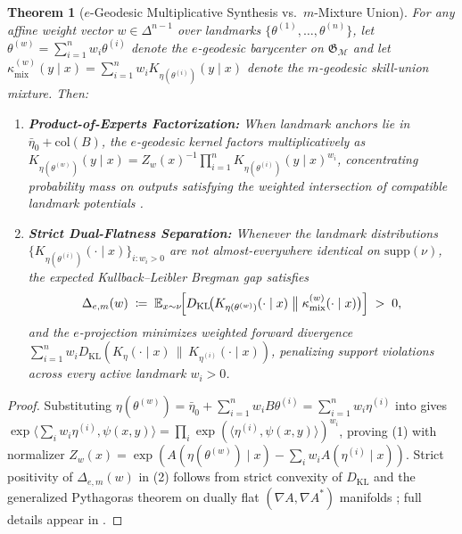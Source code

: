 \documentclass[11pt]{article}
\theoremstyle{definition}
\theoremstyle{plain}
\newtheorem{theorem}{Theorem}
\newcommand{\Mcal}{\mathcal{M}}
\newcommand{\Gfrak}{\mathfrak{G}}
\newcommand{\KL}{D_{\mathrm{KL}}}
\newcommand{\Ebb}{\mathbb{E}}
\begin{document}
\begin{theorem}[$e$-Geodesic Multiplicative Synthesis vs.\ $m$-Mixture Union]
\label{thm:geodesic}
For any affine weight vector $w \in \Delta^{n-1}$ over landmarks $\{\theta^{(1)}, \dots, \theta^{(n)}\}$, let $\theta^{(w)} = \sum_{i=1}^n w_i \theta^{(i)}$ denote the $e$-geodesic barycenter on $\Gfrak_{\Mcal}$ and let $\kappa_{\mathrm{mix}}^{(w)}(y \mid x) = \sum_{i=1}^n w_i K_{\eta(\theta^{(i)})}(y \mid x)$ denote the $m$-geodesic skill-union mixture. Then:
\begin{enumerate}[leftmargin=1.8em,itemsep=1pt,topsep=2pt]
  \item \textbf{Product-of-Experts Factorization:} When landmark anchors lie in $\bar{\eta}_0 + \mathrm{col}(B)$, the $e$-geodesic kernel factors multiplicatively as $K_{\eta(\theta^{(w)})}(y \mid x) = Z_w(x)^{-1} \prod_{i=1}^n K_{\eta(\theta^{(i)})}(y \mid x)^{w_i}$, concentrating probability mass on outputs satisfying the weighted intersection of compatible landmark potentials \citep{hinton2002training}.
  \item \textbf{Strict Dual-Flatness Separation:} Whenever the landmark distributions $\{K_{\eta(\theta^{(i)})}(\cdot \mid x)\}_{i : w_i > 0}$ are not almost-everywhere identical on $\mathrm{supp}(\nu)$, the expected Kullback--Leibler Bregman gap satisfies
  \begin{equation}
    \Delta_{e,m}(w) \;\coloneqq\; \Ebb_{x \sim \nu}\!\Bigl[\KL\!\bigl(K_{\eta(\theta^{(w)})}(\cdot \mid x) \;\big\|\; \kappa_{\mathrm{mix}}^{(w)}(\cdot \mid x)\bigr)\Bigr] \;>\; 0,
    \label{eq:bregman-gap}
  \end{equation}
  and the $e$-projection minimizes weighted forward divergence $\sum_{i=1}^n w_i \KL(K_\eta(\cdot \mid x) \,\|\, K_{\eta^{(i)}}(\cdot \mid x))$, penalizing support violations across every active landmark $w_i > 0$.
\end{enumerate}
\end{theorem}

\begin{proof}
Substituting $\eta(\theta^{(w)}) = \bar{\eta}_0 + \sum_{i=1}^n w_i B\theta^{(i)} = \sum_{i=1}^n w_i \eta^{(i)}$ into  gives $\exp\langle \sum_i w_i \eta^{(i)}, \psi(x,y)\rangle = \prod_i \exp(\langle \eta^{(i)}, \psi(x,y)\rangle)^{w_i}$, proving (1) with normalizer $Z_w(x) = \exp(A(\eta(\theta^{(w)}) \mid x) - \sum_i w_i A(\eta^{(i)} \mid x))$. Strict positivity of $\Delta_{e,m}(w)$ in (2) follows from strict convexity of $\KL$ and the generalized Pythagoras theorem on dually flat $(\nabla A, \nabla A^*)$ manifolds \citep{amari2016information}; full details appear in .
\end{proof}
\end{document}
